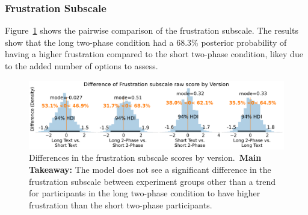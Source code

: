 
\subsubsection{Frustration Subscale}
Figure~\ref{fig:bayesian_frustration_subscale} shows the pairwise comparison of the frustration subscale. The results show that the long two-phase condition had a 68.3\% posterior probability of having a higher frustration compared to the short two-phase condition, likey due to the added number of options to assess. 

\begin{figure}[h!]
    \centering
    \includegraphics[width=\textwidth]{content/image/cog/Frustration_cog_diff_single_row.pdf}
    \caption{Differences in the frustration subscale scores by version.~\textbf{Main Takeaway:} The model does not see a significant difference in the frustration subscale between experiment groups other than a trend for participants in the long two-phase condition to have higher frustration than the short two-phase participants.}
    \label{fig:bayesian_frustration_subscale}
\end{figure}
